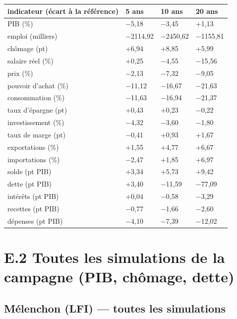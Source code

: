 \documentclass[
  11pt,
  11pt,
  a4paper,
  openany]{book}
\begin{document}
\begin{longtable}[]{@{}llll@{}}
\toprule\noalign{}
indicateur (écart à la référence) & 5 ans & 10 ans & 20 ans \\
\midrule\noalign{}
\endhead
\bottomrule\noalign{}
\endlastfoot
PIB (\%) & −5,18 & −3,45 & +1,13 \\
emploi (milliers) & −2114,92 & −2450,62 & −1155,81 \\
chômage (pt) & +6,94 & +8,85 & +5,99 \\
salaire réel (\%) & +0,25 & −4,55 & −15,56 \\
prix (\%) & −2,13 & −7,32 & −9,05 \\
pouvoir d'achat (\%) & −11,12 & −16,67 & −21,63 \\
consommation (\%) & −11,63 & −16,94 & −21,37 \\
taux d'épargne (pt) & +0,43 & +0,23 & −0,22 \\
investissement (\%) & −4,32 & −3,60 & −1,80 \\
taux de marge (pt) & −0,41 & +0,93 & +1,67 \\
exportations (\%) & +1,55 & +4,77 & +6,67 \\
importations (\%) & −2,47 & +1,85 & +6,97 \\
solde (pt PIB) & +3,34 & +5,73 & +9,42 \\
dette (pt PIB) & +3,40 & −11,59 & −77,09 \\
intérêts (pt PIB) & +0,04 & −0,58 & −3,29 \\
recettes (pt PIB) & −0,77 & −1,66 & −2,60 \\
dépenses (pt PIB) & −4,10 & −7,39 & −12,02 \\
\end{longtable}

\hypertarget{e.2-toutes-les-simulations-de-la-campagne-pib-chuxf4mage-dette}{%
\section{E.2 Toutes les simulations de la campagne (PIB, chômage,
dette)}\label{e.2-toutes-les-simulations-de-la-campagne-pib-chuxf4mage-dette}}

\hypertarget{muxe9lenchon-lfi-toutes-les-simulations}{%
\subsection{Mélenchon (LFI) --- toutes les
simulations}\label{muxe9lenchon-lfi-toutes-les-simulations}}
\end{document}
